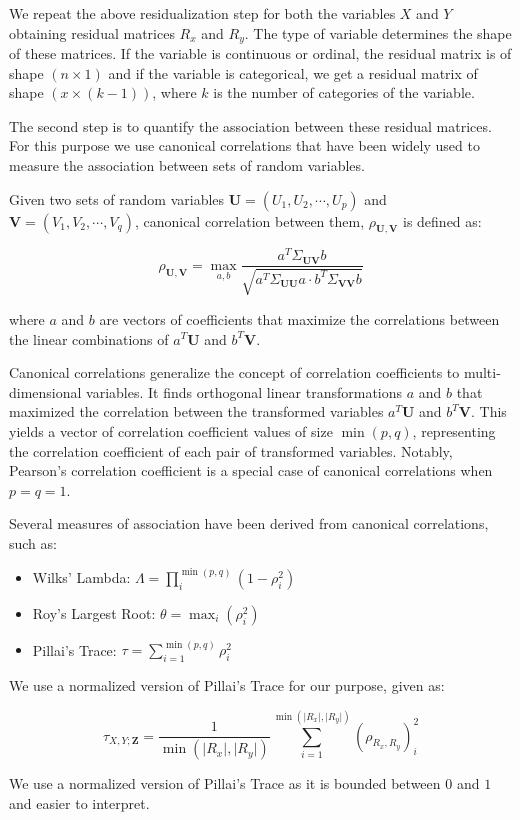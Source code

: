 We repeat the above residualization step for both the variables $ X $ and $ Y $
obtaining residual matrices $ R_x $ and $ R_y $. The type of variable determines
the shape of these matrices. If the variable is continuous or ordinal, the 
residual matrix is of shape $ (n \times 1 ) $ and if the variable is categorical,
we get a residual matrix of shape $ (x \times (k - 1)) $, where $ k $ is the number
of categories of the variable.

The second step is to quantify the association between these residual matrices.
For this purpose we use canonical correlations \citep{Hotelling1936} that have
been widely used to measure the association between sets of random variables.

\begin{definition}
	Given two sets of random variables $ \bm{U} = (U_1, U_2, \cdots, U_p) $
	and $ \bm{V} = (V_1, V_2, \cdots, V_q) $, canonical correlation between
	them, $\rho_{\bm{U}, \bm{V}} $ is defined as:
		
	\begin{equation}
		\rho_{\bm{U}, \bm{V}} = \max_{a, b} \frac{a^T \Sigma_{\bm{UV}} b}{\sqrt{a^T \Sigma_{\bm{UU}} a \cdot b^T \Sigma_{\bm{VV}} b}}
	\end{equation}

	where $ a $ and $ b $ are vectors of coefficients that maximize the correlations
	between the linear combinations of $ a^T \bm{U} $ and $ b^T \bm{V} $.
\end{definition}

Canonical correlations generalize the concept of correlation coefficients to
multi-dimensional variables. It finds orthogonal linear transformations $ a $
and $ b $ that maximized the correlation between the transformed variables $
a^T \bm{U} $ and $ b^T \bm{V} $. This yields a vector of correlation
coefficient values of size $ \min(p, q) $, representing the correlation
coefficient of each pair of transformed variables. Notably, Pearson's
correlation coefficient is a special case of canonical correlations when $ p =
q = 1 $.

Several measures of association have been derived from canonical correlations, such as:
\begin{itemize}
	\item Wilks' Lambda: $\Lambda = \prod_{i}^{\min(p, q)} (1 - \rho_i^2) $
	\item Roy's Largest Root: $ \theta = \max_i(\rho_i^2) $
	\item Pillai's Trace: $ \tau = \sum_{i=1}^{\min(p, q)} \rho_i^2 $
\end{itemize}

We use a normalized version of Pillai's Trace for our purpose, given as:

\begin{equation}
	\tau_{X, Y; \bm{Z}} = \frac{1}{\min(\rvert R_x \rvert, \rvert R_y \rvert)}
	\sum_{i=1}^{\min(\rvert R_x \rvert, \rvert R_y \rvert)} (\rho_{R_x, R_y})_i^2
\end{equation}

We use a normalized version of Pillai's Trace as it is bounded between $ 0 $
and $ 1 $ and easier to interpret.
